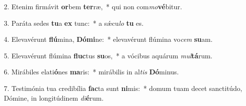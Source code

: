 2. Etenim firmávit \textbf{or}bem \textbf{ter}ræ,~*  qui non com\textit{mo}\textbf{vé}bitur.\

3. Paráta sedes \textbf{tu}a \textbf{ex} tunc:~*  a sǽcu\textit{lo} \textbf{tu} es.\

4. Elevavérunt \textbf{flú}mina, \textbf{Dó}\textbf{mi}ne:~*  elevavérunt flúmina vo\textit{cem} \textbf{su}am.\

5. Elevavérunt flúmina \textbf{fluc}tus \textbf{su}os,~*  a vócibus aquárum \textit{mul}\textbf{tá}rum.\

6. Mirábiles elati\textbf{ó}nes \textbf{ma}ris:~*  mirábilis in al\textit{tis} \textbf{Dó}minus.\

7. Testimónia tua credibília \textbf{fac}ta sunt \textbf{ni}mis:~*  domum tuam decet sanctitúdo, Dómine, in longitúdinem \textit{di}\textbf{é}rum.\

